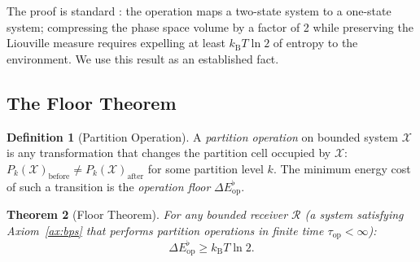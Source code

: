 \documentclass[11pt,twocolumn,a4paper]{article}
\newtheorem{theorem}{Theorem}[section]
\theoremstyle{definition}
\newtheorem{definition}[theorem]{Definition}
\theoremstyle{remark}
\newcommand{\kB}{k_{\mathrm{B}}}
\begin{document}
The proof is standard \citep{landauer1961, bennett1982}: the operation maps
a two-state system to a one-state system; compressing the phase space volume
by a factor of 2 while preserving the Liouville measure requires expelling
at least $\kB T \ln 2$ of entropy to the environment. We use this result as
an established fact.

\subsection{The Floor Theorem}

\begin{definition}[Partition Operation]
\label{def:partop}
A \emph{partition operation} on bounded system $\mathcal{X}$ is any transformation
that changes the partition cell occupied by $\mathcal{X}$:
$P_k(\mathcal{X})_{\mathrm{before}} \neq P_k(\mathcal{X})_{\mathrm{after}}$
for some partition level $k$. The minimum energy cost of such a transition is
the \emph{operation floor} $\Delta E_{\mathrm{op}}^{\flat}$.
\end{definition}

\begin{theorem}[Floor Theorem]
\label{thm:floor}
For any bounded receiver $\mathcal{R}$ (a system satisfying Axiom~\ref{ax:bps}
that performs partition operations in finite time $\tau_{\mathrm{op}} < \infty$):
\begin{equation}
\Delta E_{\mathrm{op}}^{\flat} \geq \kB T \ln 2.
\label{eq:floor}
\end{equation}
\end{theorem}
\end{document}
